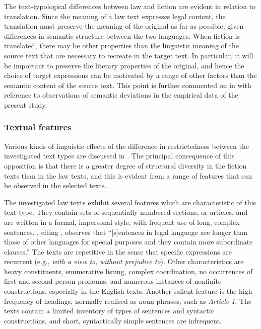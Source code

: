 \documentclass[output=paper]{LSP/langsci}
\begin{document}
The text-typological differences between law and fiction are evident in relation to translation. Since the meaning of a law text expresses legal content, the translation must preserve the meaning of the original as far as possible, given differences in semantic structure between the two languages. When fiction is translated, there may be other properties than the linguistic meaning of the source text that are necessary to recreate in the target text. In particular, it will be important to preserve the literary properties of the original, and hence the choice of target expressions can be motivated by a range of other factors than the semantic content of the source text. This point is further commented on in  with reference to observations of semantic deviations in the empirical data of the present study. 

\subsubsection{Textual features}\label{sec:thunes:4.2.2}

Various kinds of linguistic effects of the difference in restrictedness between the investigated text types are discussed in \citet[279--288]{Thunes2011}. The principal consequence of this opposition is that there is a greater degree of structural diversity in the fiction texts than in the law texts, and this is evident from a range of features that can be observed in the selected texts.

The investigated law texts exhibit several features which are characteristic of this text type. They contain sets of sequentially numbered sections, or articles, and are written in a formal, impersonal style, with frequent use of long, complex sentences. \citet[98]{Mattila2006}, citing \citet[74]{Laurén1993}, observes that ``[s]entences in legal language are longer than those of other languages for special purposes and they contain more subordinate clauses.'' The texts are repetitive in the sense that specific expressions are recurrent (e.g., \textit{with a view to}, \textit{without prejudice to}). Other characteristics are heavy constituents, enumerative listing, complex coordination, no occurrences of first and second person pronouns, and numerous instances of nonfinite constructions, especially in the English texts. Another salient feature is the high frequency of headings, normally realised as noun phrases, such as \textit{Article 1}. The texts contain a limited inventory of types of sentences and syntactic constructions, and short, syntactically simple sentences are infrequent.
\end{document}
